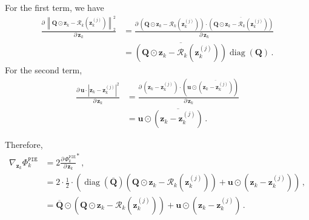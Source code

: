 \documentclass{article}
\numberwithin{equation}{section}
\begin{document}
For the first term, we have
\begin{equation*}
\begin{aligned}
     \frac{\partial\, \left\|\bm{Q}\odot \bm{z}_k -\mathcal{R}_k\left(\bm{z}_k^{(j)}\right)\right\|_2^2}{\partial\,   \bm{z}_k} &= \frac{\partial\,  \left(\bm{Q}\odot \bm{z}_k -\mathcal{R}_k\left(\bm{z}_k^{(j)}\right)\right)\cdot\overline{\left(\bm{Q}\odot \bm{z}_k -\mathcal{R}_k\left(\bm{z}_k^{(j)}\right)\right)}}{\partial\,   \bm{z}_k}\\
     &= \overline{\left(\bm{Q}\odot \bm{z}_k -\mathcal{R}_k\left(\bm{z}_k^{(j)}\right)\right)}\operatorname{diag}(\bm{Q})\,.
\end{aligned}
\end{equation*}
For the second term, 
\begin{equation*}
\begin{aligned}
     \frac{\partial\,  \bm{u}\cdot\left|\bm{z}_k-\bm{z}_k^{(j)}\right|^2}{\partial\,   \bm{z}_k} &= \frac{\partial\,  \left(\bm{z}_k-\bm{z}_k^{(j)}\right)\cdot\left(\bm{u}\odot\overline{\left(\bm{z}_k-\bm{z}_k^{(j)}\right)}\right)}{\partial\,   \bm{z}_k}\\
     &= \bm{u}\odot\overline{\left(\bm{z}_k-\bm{z}_k^{(j)}\right)}\,.
\end{aligned}
\end{equation*}

Therefore, 
\begin{equation*}
    \begin{aligned}
    \nabla_{\bm{z}_k} \Phi^{\texttt{PIE}}_k &= 2\frac{\partial\,   \Phi^{\texttt{PIE}}_k}{\partial\,  \bm{z}_k}^*\,,\\
    &= 2\cdot\frac{1}{2}\cdot\left(\operatorname{diag}\left(\overline{\bm{Q}}\right)\left(\bm{Q}\odot \bm{z}_k -\mathcal{R}_k\left(\bm{z}_k^{(j)}\right)\right)+\bm{u}\odot\left(\bm{z}_k-\bm{z}_k^{(j)}\right)\right)\,,\\
    &= \overline{\bm{Q}}\odot\left(\bm{Q}\odot \bm{z}_k -\mathcal{R}_k\left(\bm{z}_k^{(j)}\right)\right)+\bm{u}\odot\left(\bm{z}_k-\bm{z}_k^{(j)}\right)\,.
    \end{aligned}
\end{equation*}
    
\end{document}
